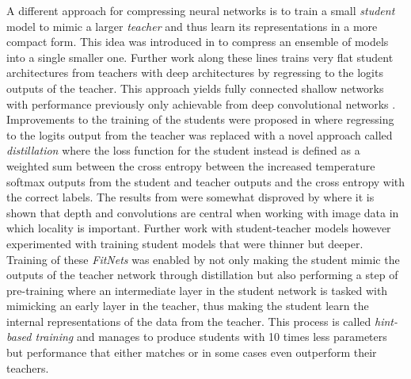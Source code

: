 \documentclass[11pt]{article}
\newcommand{\bibentry}[1]{\cite{#1}}
\begin{document}
A different approach for compressing neural networks is to train a small \emph{student} model to mimic a larger \emph{teacher} and thus learn its representations in a more compact form. This idea was introduced in\bibentry{bucilua2006model} to compress an ensemble of models into a single smaller one. Further work along these lines trains very flat student architectures from teachers with deep architectures by regressing to the logits outputs of the teacher. This approach yields fully connected shallow networks with performance previously only achievable from deep convolutional networks \bibentry{ba2014deep}. Improvements to the training of the students were proposed in\bibentry{hinton2015distilling} where regressing to the logits output from the teacher was replaced with a novel approach called \emph{distillation} where the loss function for the student instead is defined as a weighted sum between the cross entropy between the increased temperature softmax outputs from the student and teacher outputs and the cross entropy with the correct labels. 
The results from\bibentry{ba2014deep} were somewhat disproved by \bibentry{urban2016deep} where it is shown that depth and convolutions are central when working with image data in which locality is important. Further work with student-teacher models however experimented with training student models that were thinner but deeper. Training of these \emph{FitNets} was enabled by not only making the student mimic the outputs of the teacher network through distillation but also performing a step of pre-training where an intermediate layer in the student network is tasked with mimicking an early layer in the teacher, thus making the student learn the internal representations of the data from the teacher\bibentry{romero2014fitnets}. This process is called \emph{hint-based training} and manages to produce students with 10 times less parameters but performance that either matches or in some cases even outperform their teachers.
\end{document}
